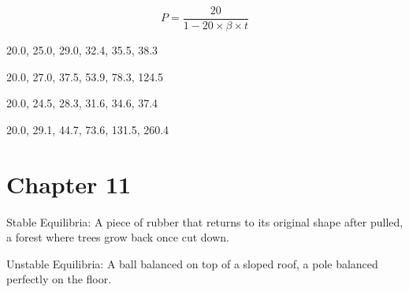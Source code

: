 \documentclass[]{memoir}
\begin{document}
\[ P = \frac{20}{1 - 20 \times \beta \times t }\]


20.0, 25.0, 29.0, 32.4, 35.5, 38.3


20.0, 27.0, 37.5, 53.9, 78.3, 124.5


20.0, 24.5, 28.3, 31.6, 34.6, 37.4


20.0, 29.1, 44.7, 73.6, 131.5, 260.4

\section{Chapter 11}


Stable Equilibria: A piece of rubber that returns to its original shape
after pulled, a forest where trees grow back once cut down.

Unstable Equilibria: A ball balanced on top of a sloped roof, a pole
balanced perfectly on the floor.

\end{document}
